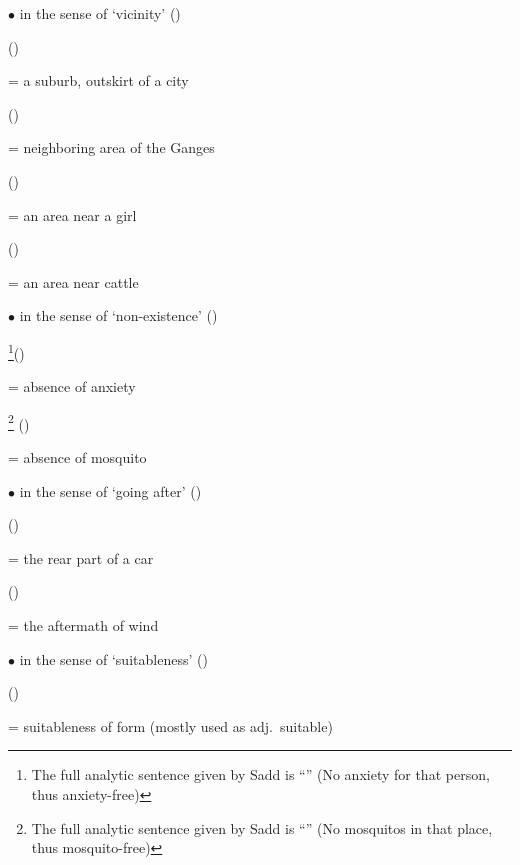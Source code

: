$\bullet$  in the sense of `vicinity' ()\par
{} ()\par \hspace{3mm} = a suburb, outskirt of a city\par
{} ()\par \hspace{3mm} = neighboring area of the Ganges\par
{} ()\par \hspace{3mm} = an area near a girl\par
{} ()\par \hspace{3mm} = an area near cattle

$\bullet$  in the sense of `non-existence' ()\par
{}\footnote{The full analytic sentence given by Sadd is ``'' (No anxiety for that person, thus anxiety-free)}()\par \hspace{3mm} = absence of anxiety\par
{}\footnote{The full analytic sentence given by Sadd is ``'' (No mosquitos in that place, thus mosquito-free)} ()\par \hspace{3mm} = absence of mosquito

$\bullet$  in the sense of `going after' ()\par
{} ()\par \hspace{3mm} = the rear part of a car\par
{} ()\par \hspace{3mm} = the aftermath of wind

$\bullet$  in the sense of `suitableness' ()\par
{} ()\par \hspace{3mm} = suitableness of form (mostly used as adj.\ suitable)

